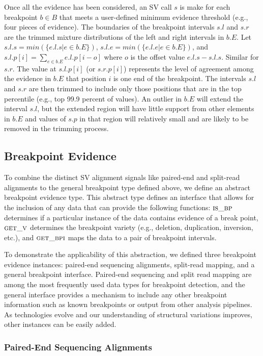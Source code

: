 \documentclass[10pt]{bmc_article}
\newenvironment{bmcformat}{\begin{raggedright}\baselineskip20pt\sloppy\setboolean{publ}{false}}{\end{raggedright}\baselineskip20pt\sloppy}
\begin{document}
\begin{bmcformat}
Once all the evidence has been considered, an SV call $s$ is make for each
breakpoint $b\in B$ that meets a user-defined minimum evidence threshold (e.g.,
four pieces of evidence).  The boundaries of the breakpoint intervals $s.l$ and
$s.r$ are the trimmed mixture distributions of the left and right intervals in
$b.E$.  Let $s.l.s=min( \{e.l.s | e\in b.E\})$, $s.l.e=min( \{e.l.e | e\in
b.E\})$, and $s.l.p[i] = \sum_{e \in b.E} e.l.p[i-o]$ where $o$ is the offset
value $e.l.s-s.l.s$.  Similar for $s.r$.  The value at $s.l.p[i]$ (or
$s.r.p[i]$) represents the level of agreement among the evidence in $b.E$ that
position $i$ is one end of the breakpoint.  The intervals $s.l$ and $s.r$ are
then trimmed to include only those positions that are in the top percentile
(e.g., top 99.9 percent of values).  An outlier in $b.E$ will extend the
interval $s.l$, but the extended region will have little support from other
elements in $b.E$ and values of $s.p$ in that region will relatively small and
are likely to be removed in the trimming process. 

\subsection*{Breakpoint Evidence}

To combine the distinct SV alignment signals like paired-end and split-read
alignments to the general breakpoint type defined above, we define an
abstract breakpoint evidence type.  This abstract type defines an interface that
allows for the inclusion of any data that can provide the following functions:
$\textsc{is\_bp}$ determines if a particular instance of the data contains
evidence of a break point, $\textsc{get\_v}$ determines the breakpoint variety
(e.g., deletion, duplication, inversion, etc.), and $\textsc{get\_bpi}$
maps the data to a pair of breakpoint intervals.

To demonstrate the applicability of this abstraction, we defined three
breakpoint evidence instances: paired-end sequencing alignments, split-read
mapping, and a general breakpoint interface.  Paired-end sequencing and split
read mapping are among the most frequently used data types for breakpoint
detection, and the general interface provides a mechanism to include any other
breakpoint information such as known breakpoints or output from other analysis
pipelines.  As technologies evolve and our understanding of structural
variations improves, other instances can be easily added.

\subsubsection*{Paired-End Sequencing Alignments}


\end{bmcformat}
\end{document}
